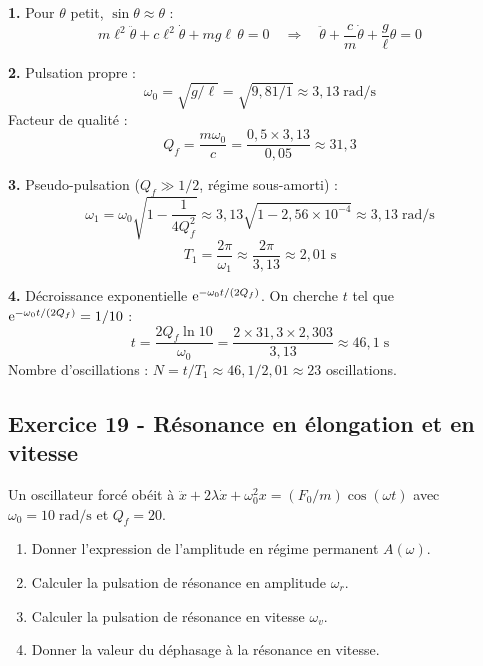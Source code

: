 \documentclass[12pt,a4paper]{article}
\begin{document}
\begin{boitecorrige}
\textbf{1.} Pour $\theta$ petit, $\sin\theta \approx \theta$ :
\[
m\ell^2\ddot{\theta} + c\ell^2\dot{\theta} + mg\ell\,\theta = 0 \quad\Longrightarrow\quad \ddot{\theta} + \frac{c}{m}\dot{\theta} + \frac{g}{\ell}\theta = 0
\]

\textbf{2.} Pulsation propre :
\[
\omega_0 = \sqrt{g/\ell} = \sqrt{9{,}81/1} \approx 3{,}13\;\text{rad/s}
\]
Facteur de qualité :
\[
Q_f = \frac{m\omega_0}{c} = \frac{0{,}5\times 3{,}13}{0{,}05} \approx 31{,}3
\]

\textbf{3.} Pseudo-pulsation ($Q_f \gg 1/2$, régime sous-amorti) :
\[
\omega_1 = \omega_0\sqrt{1 - \frac{1}{4Q_f^2}} \approx 3{,}13\sqrt{1 - 2{,}56\times 10^{-4}} \approx 3{,}13\;\text{rad/s}
\]
\[
T_1 = \frac{2\pi}{\omega_1} \approx \frac{2\pi}{3{,}13} \approx 2{,}01\;\text{s}
\]

\textbf{4.} Décroissance exponentielle $\mathrm{e}^{-\omega_0 t/(2Q_f)}$. On cherche $t$ tel que $\mathrm{e}^{-\omega_0 t/(2Q_f)} = 1/10$ :
\[
t = \frac{2Q_f \ln 10}{\omega_0} = \frac{2\times 31{,}3\times 2{,}303}{3{,}13} \approx 46{,}1\;\text{s}
\]
Nombre d'oscillations : $N = t/T_1 \approx 46{,}1/2{,}01 \approx 23$ oscillations.
\end{boitecorrige}

\subsection*{Exercice 19 - Résonance en élongation et en vitesse \niveau{\moyen}}

\begin{boiteexercice}
Un oscillateur forcé obéit à $\ddot{x} + 2\lambda\dot{x} + \omega_0^2 x = (F_0/m)\cos(\omega t)$ avec $\omega_0 = 10\;\text{rad/s}$ et $Q_f = 20$.
\begin{enumerate}
  \item Donner l'expression de l'amplitude en régime permanent $A(\omega)$.
  \item Calculer la pulsation de résonance en amplitude $\omega_r$.
  \item Calculer la pulsation de résonance en vitesse $\omega_v$.
  \item Donner la valeur du déphasage à la résonance en vitesse.
\end{enumerate}
\end{boiteexercice}
\end{document}
